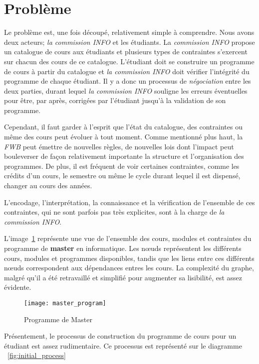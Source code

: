 \clearpage
\section{Problème}
Le problème est, une fois découpé, relativement simple à comprendre. Nous avons deux acteurs; \textit{la commission INFO} et les étudiants. 
La \textit{commission INFO} propose un catalogue de cours aux étudiants et plusieurs types de contraintes s'exercent sur chacun des cours de ce catalogue. L'étudiant doit se construire un programme de cours à partir du catalogue et \textit{la commission INFO} doit vérifier l'intégrité du programme de chaque étudiant. Il y a donc un processus de \textit{négociation} entre les deux parties, durant lequel \textit{la commission INFO} souligne les erreurs éventuelles pour être, par après,  corrigées par l'étudiant jusqu'à la validation de son programme.

Cependant, il faut garder à l'esprit que l'état du catalogue, des contraintes ou même des cours peut évoluer à tout moment. Comme mentionné plus haut, la \textit{FWB} peut émettre de nouvelles règles, de nouvelles lois dont l'impact peut bouleverser de façon relativement importante la structure et l'organisation des programmes. De plus, il est fréquent de voir certaines contraintes, comme les crédits d'un cours, le semestre ou même le cycle durant lequel il est dispensé, changer au cours des années.

L'encodage, l'interprétation, la connaissance et la vérification de l'ensemble de ces contraintes, qui ne sont parfois pas très explicites, sont à la charge de \textit{la commission INFO}.

L'image~\ref{fig:master_program} représente une vue de l'ensemble des cours, modules et contraintes du programme de \textbf{master} en informatique. Les nœuds représentent les différents cours, modules et programmes disponibles, tandis que les liens entre ces différents nœuds correspondent aux dépendances entres les cours. La complexité du graphe, malgré qu'il a été retravaillé et simplifié pour augmenter sa lisibilité, est assez évidente.

\begin{figure}
\centering
\caption{Programme de Master}
\texttt{[image: master\_program]}
\label{fig:master_program}
\end{figure}

Présentement, le processus de construction du programme de cours pour un étudiant est assez rudimentaire. Ce processus est représenté sur le diagramme ~\ref{fig:initial_process}

